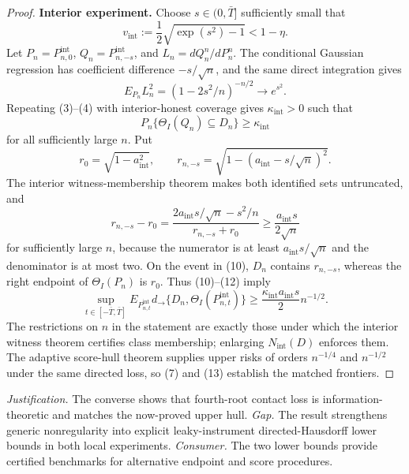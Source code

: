 \documentclass{article}
\begin{document}
\begin{proof}
\textbf{Interior experiment.} Choose \(s\in(0,\bar T]\) sufficiently small that
\[
 v_{\mathrm{int}}:=\frac12\sqrt{\exp(s^2)-1}<1-\eta. \tag{8}
\]
Let \(P_n=P_{n,0}^{\mathrm{int}}\), \(Q_n=P_{n,-s}^{\mathrm{int}}\), and \(L_n=dQ_n^n/dP_n^n\). The conditional Gaussian regression has coefficient difference \(-s/\sqrt n\), and the same direct integration gives
\[
 E_{P_n}L_n^2=(1-2s^2/n)^{-n/2}\longrightarrow e^{s^2}. \tag{9}
\]
Repeating (3)--(4) with interior-honest coverage gives \(\kappa_{\mathrm{int}}>0\) such that
\[
 P_n\{\Theta_I(Q_n)\subseteq D_n\}\geq\kappa_{\mathrm{int}} \tag{10}
\]
for all sufficiently large \(n\). Put
\[
 r_0=\sqrt{1-a_{\mathrm{int}}^2},
 \qquad
 r_{n,-s}=\sqrt{1-(a_{\mathrm{int}}-s/\sqrt n)^2}. \tag{11}
\]
The interior witness-membership theorem makes both identified sets untruncated, and
\[
 r_{n,-s}-r_0
 =\frac{2a_{\mathrm{int}}s/\sqrt n-s^2/n}{r_{n,-s}+r_0}
 \geq\frac{a_{\mathrm{int}}s}{2\sqrt n} \tag{12}
\]
for sufficiently large \(n\), because the numerator is at least \(a_{\mathrm{int}}s/\sqrt n\) and the denominator is at most two. On the event in (10), \(D_n\) contains \(r_{n,-s}\), whereas the right endpoint of \(\Theta_I(P_n)\) is \(r_0\). Thus (10)--(12) imply
\[
 \sup_{t\in[-\bar T,\bar T]}E_{P_{n,t}^{\mathrm{int}}}
 d_{\to}\{D_n,\Theta_I(P_{n,t}^{\mathrm{int}})\}
 \geq\frac{\kappa_{\mathrm{int}}a_{\mathrm{int}}s}{2}n^{-1/2}. \tag{13}
\]
The restrictions on \(n\) in the statement are exactly those under which the interior witness theorem certifies class membership; enlarging \(N_{\mathrm{int}}(D)\) enforces them. The adaptive score-hull theorem supplies upper risks of orders \(n^{-1/4}\) and \(n^{-1/2}\) under the same directed loss, so (7) and (13) establish the matched frontiers.
\end{proof}
\par\smallskip\noindent \textit{Justification.} The converse shows that fourth-root contact loss is information-theoretic and matches the now-proved upper hull. \textit{Gap.} The result strengthens generic nonregularity into explicit leaky-instrument directed-Hausdorff lower bounds in both local experiments. \textit{Consumer.} The two lower bounds provide certified benchmarks for alternative endpoint and score procedures.
\end{document}
